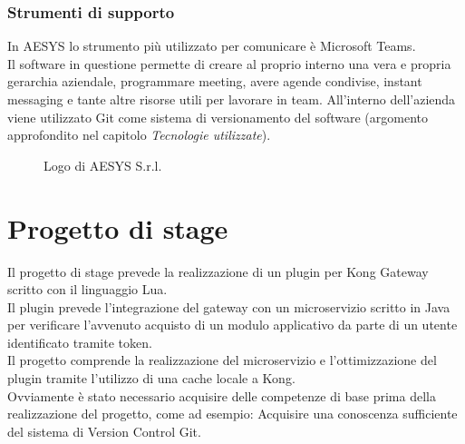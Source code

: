 \subsubsection{Strumenti di supporto}
In AESYS lo strumento più utilizzato per comunicare è Microsoft Teams.\\
Il software in questione permette di creare al proprio interno una vera e propria gerarchia aziendale, programmare meeting, avere agende condivise, instant messaging e tante altre risorse utili per lavorare in team.
All’interno dell’azienda viene utilizzato Git come sistema di versionamento del software (argomento approfondito nel capitolo \emph{Tecnologie utilizzate}).\\

\begin{figure}[ht]
	\centering
	\caption{Logo di AESYS S.r.l.}
	\label{fig:one}
\end{figure}

\section{Progetto di stage}\label{sec:progetto}
Il progetto di stage prevede la realizzazione di un plugin per Kong Gateway scritto con il linguaggio Lua.\\
Il plugin prevede l'integrazione del gateway con un microservizio scritto in Java per verificare l'avvenuto acquisto di un modulo applicativo da parte di un utente identificato tramite token.\\
Il progetto comprende la realizzazione del microservizio e l'ottimizzazione del plugin tramite l'utilizzo di una cache locale a Kong.\\

Ovviamente è stato necessario acquisire delle competenze di base prima della realizzazione del progetto, come ad esempio:
Acquisire una conoscenza sufficiente del sistema di Version Control Git.

